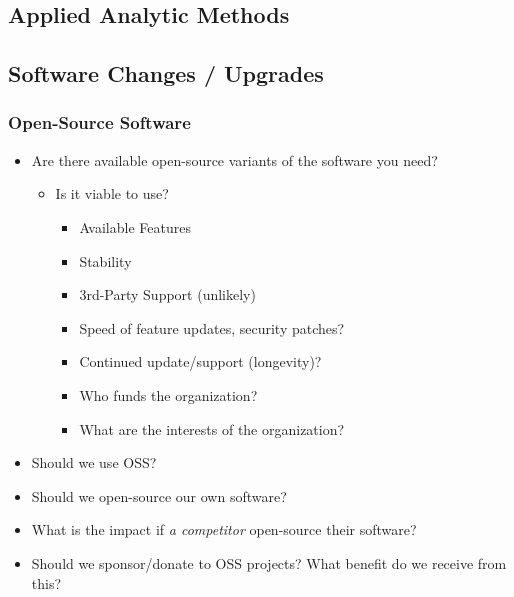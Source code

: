 \documentclass{sciposter}
\begin{document}
\begin{multicols}{3}
\section{Applied Analytic Methods}
\subsection{Software Changes / Upgrades}
\subsubsection{Open-Source Software}

\begin{mdframed}
\begin{itemize}
\item Are there available open-source variants of the software you need?
	\begin{itemize}
		\item Is it viable to use?
		\begin{itemize}
			\item Available Features
			\item Stability
			\item 3rd-Party Support (unlikely)
			\item Speed of feature updates, security patches?
			\item Continued update/support (longevity)?
			\item Who funds the organization?
			\item What are the interests of the organization?
		\end{itemize}
	\end{itemize}
	
\item Should we use OSS?
\item Should we open-source our own software?
\item What is the impact if \textit{a competitor} open-source their software?
\item Should we sponsor/donate to OSS projects? What benefit do we receive from this?
\end{itemize}
\end{mdframed}


\end{multicols}
\end{document}
